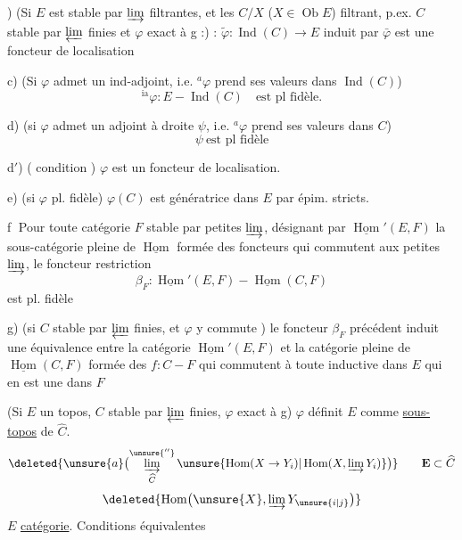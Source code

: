 )  (Si $E$ est stable par  $\varinjlim$ filtrantes, et les $C/X$ ($X\in\operatorname{Ob} E$) filtrant, p.ex. $C$ stable par $\varprojlim$ finies et $\varphi$ exact à g :) : $\widetilde\varphi:\operatorname{Ind}(C)\to E$ induit par $\bar\varphi$ est une foncteur de localisation

c) (Si $\varphi$ admet un ind-adjoint, i.e. ${}^a\varphi$ prend ses valeurs dans $\operatorname{Ind}(C)$)
\[
 {}^{\mathrm{ia}}\varphi:E\mathbin{-}\operatorname{Ind}(C)\quad\text{est pl fidèle.}
\]

d) (si $\varphi$ admet un adjoint à droite $\psi$, i.e. ${}^a\varphi$ prend ses valeurs dans $C$)
\[
 \psi\ \text{est pl fidèle}
\]

d$'$)  ( condition ) $\varphi$ est un foncteur de localisation.

e) (si $\varphi$ pl. fidèle) $\varphi(C)$ est génératrice dans $E$ par épim. stricts.

\textcircled{f} Pour toute catégorie $F$ stable par petites $\varinjlim$, désignant par $\underline{\operatorname{Hom}}'(E,F)$ la sous-catégorie pleine de $\underline{\operatorname{Hom}}$ formée des foncteurs qui commutent aux petites $\varinjlim$, le foncteur restriction
\[
 \beta_F:\underline{\operatorname{Hom}}'(E,F)\mathbin{-}\underline{\operatorname{Hom}}(C,F)
\]
est pl. fidèle


g) (si $C$ stable par $\varprojlim$ finies, et $\varphi$ y commute ) le foncteur $\beta_F$ précédent induit une équivalence entre la catégorie $\underline{\operatorname{Hom}}'(E,F)$ et la  catégorie pleine de $\underline{\operatorname{Hom}}(C,F)$ formée des $f:C\mathbin{-}F$  qui commutent à toute  inductive dans $E$ qui en est une dans $F$


  (Si $E$ un topos, $C$ stable par $\varprojlim$ finies, $\varphi$ exact à g) $\varphi$ définit $E$ comme \uline{sous-topos} de $\widehat C$.
\[
 \deleted{\unsure{a}\bigl(\varinjlim_{\widehat C}^{\unsure{''}}\unsure{\operatorname{Hom}(X\to Y_i)|\operatorname{Hom}(X,\varinjlim Y_i)}\bigr)}
 \qquad \mathbf E\subset\widehat C
\]
\[
 \deleted{\operatorname{Hom}\bigl(\unsure{X},\varinjlim Y_{\unsure{i|j}}\bigr)}
\]
$E$ \uline{catégorie}. Conditions équivalentes

